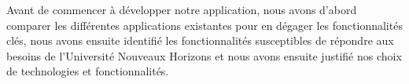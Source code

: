 Avant de commencer à développer notre application, nous avons d'abord
comparer les différentes applications existantes pour en dégager les
fonctionnalités clés, nous avons ensuite identifié les fonctionnalités
susceptibles de répondre aux besoins de l'Université Nouveaux Horizons et nous
avons ensuite justifié nos choix de technologies et fonctionnalités. 

